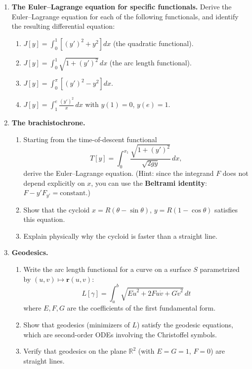 \begin{enumerate}

    \item \textbf{The Euler--Lagrange equation for specific functionals.}
    Derive the Euler--Lagrange equation for each of the following functionals, and identify the resulting differential equation:
    \begin{enumerate}
        \item $J[y] = \int_0^1 \left[(y')^2 + y^2\right] dx$ (the quadratic functional).
        \item $J[y] = \int_0^1 \sqrt{1 + (y')^2} \, dx$ (the arc length functional).
        \item $J[y] = \int_0^\pi \left[(y')^2 - y^2\right] dx$.
        \item $J[y] = \int_1^e \frac{(y')^2}{x} \, dx$ with $y(1) = 0$, $y(e) = 1$.
    \end{enumerate}

    \item \textbf{The brachistochrone.}
    \begin{enumerate}
        \item Starting from the time-of-descent functional
        \[
            T[y] = \int_0^{x_1} \frac{\sqrt{1 + (y')^2}}{\sqrt{2gy}} \, dx,
        \]
        derive the Euler--Lagrange equation. (Hint: since the integrand $F$ does not depend explicitly on $x$, you can use the \textbf{Beltrami identity}: $F - y' F_{y'} = \text{constant}$.)
        \item Show that the cycloid $x = R(\theta - \sin\theta)$, $y = R(1 - \cos\theta)$ satisfies this equation.
        \item Explain physically why the cycloid is faster than a straight line.
    \end{enumerate}

    \item \textbf{Geodesics.}
    \begin{enumerate}
        \item Write the arc length functional for a curve on a surface $S$ parametrized by $(u, v) \mapsto \mathbf{r}(u, v)$:
        \[
            L[\gamma] = \int_a^b \sqrt{E \dot{u}^2 + 2F \dot{u}\dot{v} + G \dot{v}^2} \, dt
        \]
        where $E, F, G$ are the coefficients of the first fundamental form.
        \item Show that geodesics (minimizers of $L$) satisfy the geodesic equations, which are second-order ODEs involving the Christoffel symbols.
        \item Verify that geodesics on the plane $\mathbb{R}^2$ (with $E = G = 1$, $F = 0$) are straight lines.
    \end{enumerate}


\end{enumerate}
